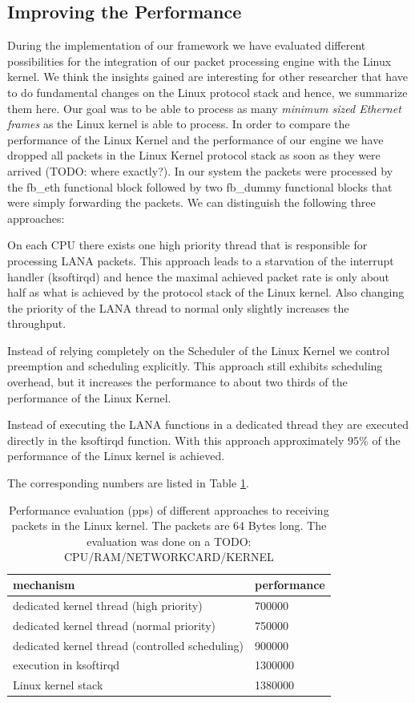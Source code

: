 \documentclass{sig-alternate}
\begin{document}
\subsection{Improving the Performance}
During the implementation of our framework we have evaluated different possibilities for the integration of our packet processing engine with the Linux kernel. We think the insights gained are interesting for other researcher that have to do fundamental changes on the Linux protocol stack and hence, we summarize them here. 
Our goal was to be able to process as many \textit{minimum sized Ethernet frames} as the Linux kernel is able to process. In order to compare the performance of the Linux Kernel and the performance of our engine we have dropped all packets in the Linux Kernel protocol stack as soon as they were arrived (TODO: where exactly?). In our system the packets were processed by the fb\_eth functional block followed by two fb\_dummy functional blocks that were simply forwarding the packets. We can distinguish the following three approaches:
\begin{compactitem}
\item On each CPU there exists one high priority thread that is responsible for processing LANA packets. This approach leads to a starvation of the interrupt handler (ksoftirqd) and hence the maximal achieved packet rate is only about half as what is achieved by the protocol stack of the Linux kernel. Also changing the priority of the LANA thread to normal only slightly increases the throughput.
\item Instead of relying completely on the Scheduler of the Linux Kernel we control preemption and scheduling explicitly. This approach still exhibits scheduling overhead, but it increases the performance to about two thirds of the performance of the Linux Kernel. 
\item Instead of executing the LANA functions in a dedicated thread they are executed directly in the ksoftirqd function. With this approach approximately $95\%$ of the performance of the Linux kernel is achieved.
\end{compactitem}
The corresponding numbers are listed in Table \ref{tab:performance}.

\begin{table}[htb]
\begin{tabular}{ l l }
mechanism & performance\\
\hline
dedicated kernel thread (high priority) & 700000\\
dedicated kernel thread (normal priority) & 750000\\
dedicated kernel thread (controlled scheduling) & 900000\\
execution in ksoftirqd & 1300000\\
Linux kernel stack & 1380000\\
\end{tabular}
\caption{Performance evaluation (pps) of different approaches to receiving packets in the Linux kernel. The packets are 64 Bytes long. The evaluation was done on a TODO: CPU/RAM/NETWORKCARD/KERNEL}
\label{tab:performance}
\end{table}	
\end{document}
